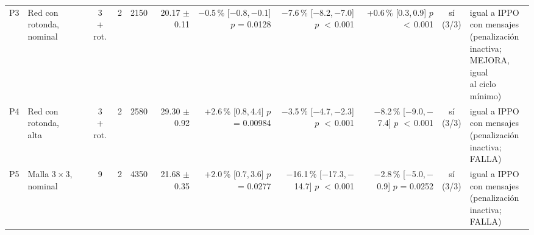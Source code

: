 \begin{table}[H]
\begin{tabular}{llcrrrrrrcl}
P3 & \makecell[l]{Red con\\{}rotonda,\\{}nominal} & \makecell[c]{3\\{}+ rot.} & 2 & 2150 & \makecell[r]{20.17\\{}$\pm$ 0.11} & \makecell[r]{$-$0.5\,\%\\{}[$-$0.8,\,$-$0.1]\\$p$ = 0.0128} & \makecell[r]{$-$7.6\,\%\\{}[$-$8.2,\,$-$7.0]\\$p$ $<$\,0.001} & \makecell[r]{+0.6\,\%\\{}[0.3,\,0.9]\\$p$ $<$\,0.001} & \makecell[c]{sí\\{}(3/3)} & \makecell[l]{igual a IPPO\\{}con mensajes\\{}(penalización\\{}inactiva;\\{}MEJORA, igual\\{}al ciclo\\{}mínimo)} \\
P4 & \makecell[l]{Red con\\{}rotonda,\\{}alta} & \makecell[c]{3\\{}+ rot.} & 2 & 2580 & \makecell[r]{29.30\\{}$\pm$ 0.92} & \makecell[r]{+2.6\,\%\\{}[0.8,\,4.4]\\$p$ = 0.00984} & \makecell[r]{$-$3.5\,\%\\{}[$-$4.7,\,$-$2.3]\\$p$ $<$\,0.001} & \makecell[r]{$-$8.2\,\%\\{}[$-$9.0,\,$-$7.4]\\$p$ $<$\,0.001} & \makecell[c]{sí\\{}(3/3)} & \makecell[l]{igual a IPPO\\{}con mensajes\\{}(penalización\\{}inactiva;\\{}FALLA)} \\
P5 & \makecell[l]{Malla $3 \times 3$,\\{}nominal} & 9 & 2 & 4350 & \makecell[r]{21.68\\{}$\pm$ 0.35} & \makecell[r]{+2.0\,\%\\{}[0.7,\,3.6]\\$p$ = 0.0277} & \makecell[r]{$-$16.1\,\%\\{}[$-$17.3,\,$-$14.7]\\$p$ $<$\,0.001} & \makecell[r]{$-$2.8\,\%\\{}[$-$5.0,\,$-$0.9]\\$p$ = 0.0252} & \makecell[c]{sí\\{}(3/3)} & \makecell[l]{igual a IPPO\\{}con mensajes\\{}(penalización\\{}inactiva;\\{}FALLA)} \\

\end{tabular}
\end{table}
